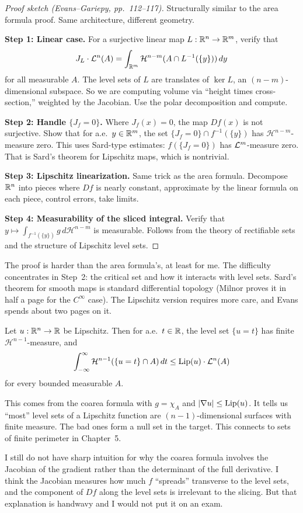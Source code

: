 \begin{proof}[Proof sketch (Evans--Gariepy, pp.~112--117)]
Structurally similar to the area formula proof. Same architecture, different geometry.

\medskip
\noindent\textbf{Step 1: Linear case.}
For a surjective linear map $L : \mathbb{R}^n \to \mathbb{R}^m$, verify that
\[
  J_L \cdot \mathcal{L}^n(A) = \int_{\mathbb{R}^m} \mathcal{H}^{n-m}(A \cap L^{-1}(\{y\})) \, dy
\]
for all measurable $A$. The level sets of $L$ are translates of $\ker L$, an $(n-m)$-dimensional subspace. So we are computing volume via ``height times cross-section,'' weighted by the Jacobian. Use the polar decomposition and compute.

\medskip
\noindent\textbf{Step 2: Handle $\{J_f = 0\}$.}
Where $J_f(x) = 0$, the map $Df(x)$ is not surjective. Show that for a.e.\ $y \in \mathbb{R}^m$, the set $\{J_f = 0\} \cap f^{-1}(\{y\})$ has $\mathcal{H}^{n-m}$-measure zero. This uses Sard-type estimates: $f(\{J_f = 0\})$ has $\mathcal{L}^m$-measure zero. That is Sard's theorem for Lipschitz maps, which is nontrivial.

\medskip
\noindent\textbf{Step 3: Lipschitz linearization.}
Same trick as the area formula. Decompose $\mathbb{R}^n$ into pieces where $Df$ is nearly constant, approximate by the linear formula on each piece, control errors, take limits.

\medskip
\noindent\textbf{Step 4: Measurability of the sliced integral.}
Verify that $y \mapsto \int_{f^{-1}(\{y\})} g \, d\mathcal{H}^{n-m}$ is measurable. Follows from the theory of rectifiable sets and the structure of Lipschitz level sets.
\end{proof}

The proof is harder than the area formula's, at least for me. The difficulty concentrates in Step~2: the critical set and how it interacts with level sets. Sard's theorem for smooth maps is standard differential topology (Milnor proves it in half a page for the $C^\infty$ case). The Lipschitz version requires more care, and Evans spends about two pages on it.

\begin{corollary}
\label{cor:coarea-perimeter}
Let $u : \mathbb{R}^n \to \mathbb{R}$ be Lipschitz. Then for a.e.\ $t \in \mathbb{R}$, the level set $\{u = t\}$ has finite $\mathcal{H}^{n-1}$-measure, and
\[
  \int_{-\infty}^{\infty} \mathcal{H}^{n-1}(\{u = t\} \cap A) \, dt \leq \operatorname{Lip}(u) \cdot \mathcal{L}^n(A)
\]
for every bounded measurable $A$.
\end{corollary}

This comes from the coarea formula with $g = \chi_A$ and $|\nabla u| \leq \operatorname{Lip}(u)$. It tells us ``most'' level sets of a Lipschitz function are $(n-1)$-dimensional surfaces with finite measure. The bad ones form a null set in the target. This connects to sets of finite perimeter in Chapter~5.

I still do not have sharp intuition for why the coarea formula involves the Jacobian of the gradient rather than the determinant of the full derivative. I think the Jacobian measures how much $f$ ``spreads'' transverse to the level sets, and the component of $Df$ along the level sets is irrelevant to the slicing. But that explanation is handwavy and I would not put it on an exam.
